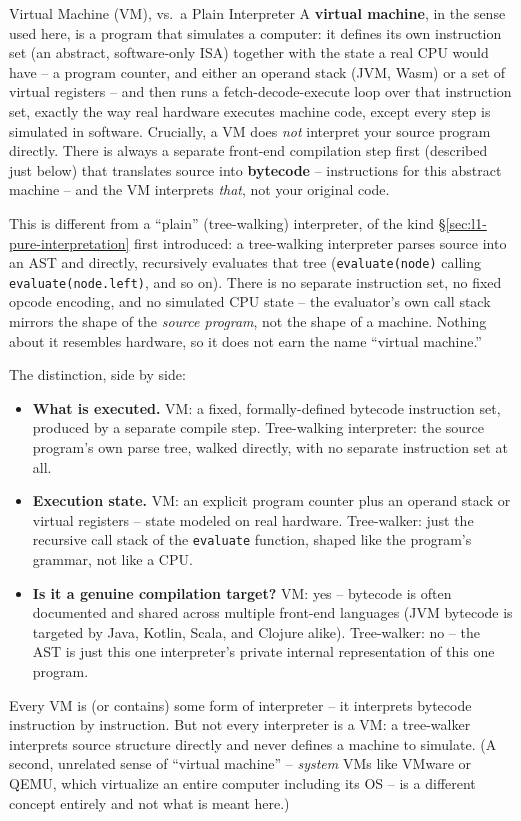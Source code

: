 \documentclass[full-course-notes.tex]{subfiles}
\begin{document}
\begin{defbox}{Virtual Machine (VM), vs.\ a Plain Interpreter}
A \textbf{virtual machine}, in the sense used here, is a program that simulates a computer: it
defines its own instruction set (an abstract, software-only ISA) together with the state a real
CPU would have -- a program counter, and either an operand stack (JVM, Wasm) or a set of virtual
registers -- and then runs a fetch-decode-execute loop over that instruction set, exactly the way
real hardware executes machine code, except every step is simulated in software. Crucially, a VM
does \emph{not} interpret your source program directly. There is always a separate front-end
compilation step first (described just below) that translates source into \textbf{bytecode} --
instructions for this abstract machine -- and the VM interprets \emph{that}, not your original
code.

This is different from a ``plain'' (tree-walking) interpreter, of the kind
\S\ref{sec:l1-pure-interpretation} first introduced: a tree-walking interpreter parses source
into an AST and directly, recursively evaluates that tree (\texttt{evaluate(node)} calling
\texttt{evaluate(node.left)}, and so on). There is no separate instruction set, no fixed opcode
encoding, and no simulated CPU state -- the evaluator's own call stack mirrors the shape of the
\emph{source program}, not the shape of a machine. Nothing about it resembles hardware, so it
does not earn the name ``virtual machine.''

The distinction, side by side:
\begin{itemize}
  \item \textbf{What is executed.} VM: a fixed, formally-defined bytecode instruction set,
  produced by a separate compile step. Tree-walking interpreter: the source program's own parse
  tree, walked directly, with no separate instruction set at all.
  \item \textbf{Execution state.} VM: an explicit program counter plus an operand stack or
  virtual registers -- state modeled on real hardware. Tree-walker: just the recursive call
  stack of the \texttt{evaluate} function, shaped like the program's grammar, not like a CPU.
  \item \textbf{Is it a genuine compilation target?} VM: yes -- bytecode is often documented and
  shared across multiple front-end languages (JVM bytecode is targeted by Java, Kotlin, Scala,
  and Clojure alike). Tree-walker: no -- the AST is just this one interpreter's private internal
  representation of this one program.
\end{itemize}
Every VM is (or contains) some form of interpreter -- it interprets bytecode instruction by
instruction. But not every interpreter is a VM: a tree-walker interprets source structure directly
and never defines a machine to simulate. (A second, unrelated sense of ``virtual machine'' --
\emph{system} VMs like VMware or QEMU, which virtualize an entire computer including its OS --
is a different concept entirely and not what is meant here.)
\end{defbox}
\end{document}
